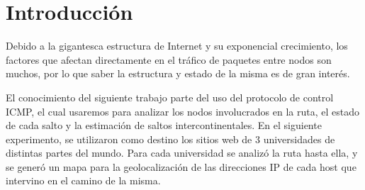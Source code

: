 \section{Introducción}

Debido a la gigantesca estructura de Internet y su exponencial crecimiento, los factores que afectan directamente en el tráfico de paquetes entre nodos son muchos, por lo que saber la estructura y estado de la misma es de gran interés.
	
El conocimiento del siguiente trabajo parte del uso del protocolo de control ICMP, el cual usaremos para analizar los nodos involucrados en la ruta, el estado de cada salto y la estimación de saltos intercontinentales. En el siguiente experimento, se utilizaron como destino los sitios web de 3 universidades de distintas partes del mundo. Para cada universidad se analizó la ruta hasta ella, y se generó un mapa para la geolocalización de las direcciones IP de cada host que intervino en el camino de la misma.
